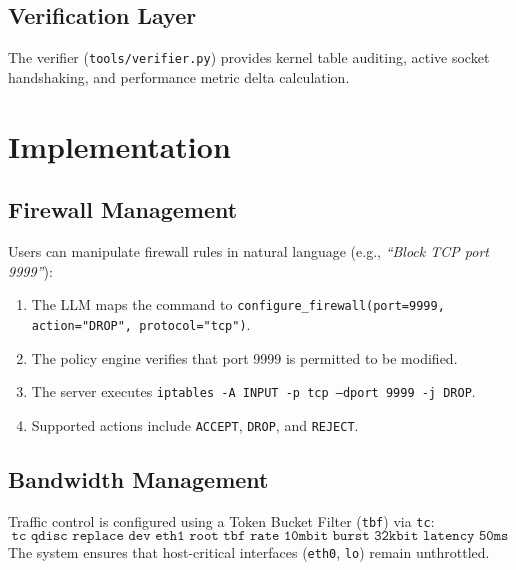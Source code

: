 \documentclass[11pt,a4paper]{article}
\begin{document}
\subsection{Verification Layer}
The verifier (\texttt{tools/verifier.py}) provides kernel table auditing, active socket handshaking, and performance metric delta calculation.

\section{Implementation}

\subsection{Firewall Management}
Users can manipulate firewall rules in natural language (e.g., \textit{``Block TCP port 9999''}):
\begin{enumerate}
    \item The LLM maps the command to \texttt{configure\_firewall(port=9999, action="DROP", protocol="tcp")}.
    \item The policy engine verifies that port 9999 is permitted to be modified.
    \item The server executes \texttt{iptables -A INPUT -p tcp --dport 9999 -j DROP}.
    \item Supported actions include \texttt{ACCEPT}, \texttt{DROP}, and \texttt{REJECT}.
\end{enumerate}

\subsection{Bandwidth Management}
Traffic control is configured using a Token Bucket Filter (\texttt{tbf}) via \texttt{tc}:
\[
\texttt{tc qdisc replace dev eth1 root tbf rate 10mbit burst 32kbit latency 50ms}
\]
The system ensures that host-critical interfaces (\texttt{eth0}, \texttt{lo}) remain unthrottled.
\end{document}
